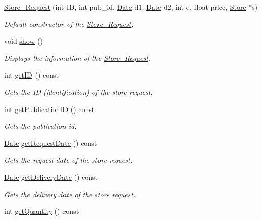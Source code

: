 \begin{DoxyCompactItemize}
\item 
\hyperlink{class_store___request_a97c16609ede5914e504b87a4cb7f085c}{Store\+\_\+\+Request} (int ID, int pub\+\_\+id, \hyperlink{class_date}{Date} d1, \hyperlink{class_date}{Date} d2, int q, float price, \hyperlink{class_store}{Store} $\ast$s)
\begin{DoxyCompactList}\small\item\em Default constructor of the \hyperlink{class_store___request}{Store\+\_\+\+Request}. \end{DoxyCompactList}\item 
void \hyperlink{class_store___request_a1827180c3d971d1e6a4e6bfc85641019}{show} ()
\begin{DoxyCompactList}\small\item\em Displays the information of the \hyperlink{class_store___request}{Store\+\_\+\+Request}. \end{DoxyCompactList}\item 
int \hyperlink{class_store___request_aea346d2504acd89a30dd7aa79b633e0e}{get\+ID} () const
\begin{DoxyCompactList}\small\item\em Gets the ID (identification) of the store request. \end{DoxyCompactList}\item 
int \hyperlink{class_store___request_a50429baf56bd03b19c8d53d00e8af756}{get\+Publication\+ID} () const
\begin{DoxyCompactList}\small\item\em Gets the publication id. \end{DoxyCompactList}\item 
\hyperlink{class_date}{Date} \hyperlink{class_store___request_ad7e54515056bd56878bb933a4ccff2a2}{get\+Request\+Date} () const
\begin{DoxyCompactList}\small\item\em Gets the request date of the store request. \end{DoxyCompactList}\item 
\hyperlink{class_date}{Date} \hyperlink{class_store___request_af659200be3b40797cc7f44b43febac85}{get\+Delivery\+Date} () const
\begin{DoxyCompactList}\small\item\em Gets the delivery date of the store request. \end{DoxyCompactList}\item 
int \hyperlink{class_store___request_aad810d40b6c8cfd55276cd069c2309f8}{get\+Quantity} () const

\end{DoxyCompactItemize}
